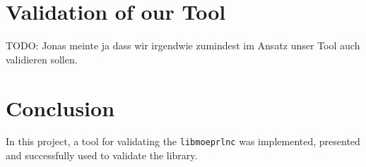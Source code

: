 \documentclass[a4paper,english,10pt]{tumarticle}
\begin{document}

\begin{figure}[htb]
  \centering
  \hfill
  \caption{}
  \label{fig:hists}
\end{figure}



\section{Validation of our Tool}\label{val}
TODO: Jonas meinte ja dass wir irgendwie zumindest im Ansatz unser Tool auch validieren sollen. 

\section{Conclusion}\label{con}
In this project, a tool for validating the \texttt{libmoeprlnc} was implemented, presented and successfully used 
to validate the library. 
\end{document}
